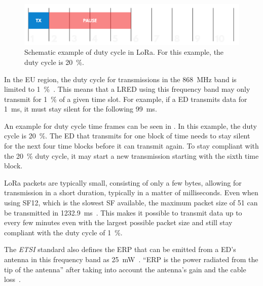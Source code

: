 \begin{figure}[htbp]
    \centering
    \includegraphics[width=.8\textwidth]{pictures/lora/duty-cycle-single-channel-off-air.png}
    \caption[Schematic example of duty cycle in \acs{LoRa}.]{
        Schematic example of duty cycle in \ac{LoRa}.
        For this example, the duty cycle is \SI{20}{\percent}.~\protect\cite{the_things_industries_bv_duty_nodate}
    }\label{pic:lora-duty-cycle}
\end{figure}

In the \ac{EU} region, the duty cycle for transmissions in the \SI{868}{\mega\hertz} band is limited to \SI{1}{\percent}~\cite[p. 29]{etsi_etsi_2012}.
This means that a \acl{LRED} using this frequency band may only transmit for \SI{1}{\percent} of a given time slot.
For example, if a \acl{ED} transmits data for \SI{1}{\milli\second}, it must stay silent for the following \SI{99}{\milli\second}.

An example for duty cycle time frames can be seen in .
In this example, the duty cycle is \SI{20}{\percent}.
The \acl{ED} that transmits for one block of time needs to stay silent for the next four time blocks before it can transmit again.
To stay compliant with the \SI{20}{\percent} duty cycle, it may start a new transmission starting with the sixth time block.

LoRa packets are typically small, consisting of only a few bytes, allowing for transmission in a short duration, typically in a matter of milliseconds.
Even when using \acs{SF}12, which is the slowest \acs{SF} available, the maximum packet size of \SI{51}{\byte} can be transmitted in  \SI{1232.9}{\milli\second}~\cite[p. 6]{the_things_network_lorawan_nodate}\cite[p. 10f]{lora_alliance_inc_lorawan_regional_2017}.
This makes it possible to transmit data up to every few minutes even with the largest possible packet size and still stay compliant with the duty cycle of \SI{1}{\percent}.

The \emph{ETSI} standard also defines the \acf{ERP} that can be emitted from a \acl{ED}'s antenna in this frequency band as \SI{25}{\milli\watt}~\cite[p. 29]{etsi_etsi_2012}.
``\ac{ERP} is the power radiated from the tip of the antenna'' after taking into account the antenna's gain and the cable loss~\cite[p. 23]{faruque_radio_2015}.


